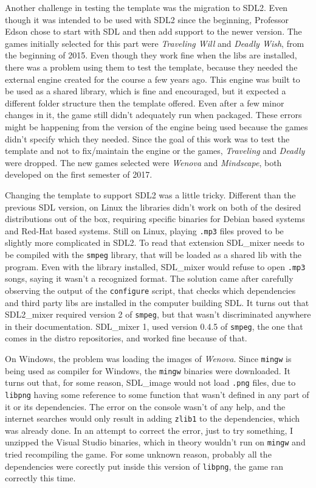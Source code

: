 Another challenge in testing the template was the migration to SDL2. Even though it was intended to be used with SDL2 since the beginning, Professor Edson chose to start with SDL and then add support to the newer version. The games initially selected for this part were \textit{Traveling Will} and \textit{Deadly Wish}, from the beginning of 2015. Even though they work fine when the libs are installed, there was a problem using them to test the template, because they needed the external engine created for the course a few years ago. This engine was built to be used as a shared library, which is fine and encouraged, but it expected a different folder structure then the template offered. Even after a few minor changes in it, the game still didn't adequately run when packaged. These errors might be happening from the version of the engine being used because the games didn't specify which they needed. Since the goal of this work was to test the template and not to fix/maintain the engine or the games, \textit{Traveling} and \textit{Deadly} were dropped. The new games selected were \textit{Wenova} and \textit{Mindscape}, both developed on the first semester of 2017.

Changing the template to support SDL2 was a little tricky. Different than the previous SDL version, on Linux the libraries didn't work on both of the desired distributions out of the box, requiring specific binaries for Debian based systems and Red-Hat based systems. Still on Linux, playing \texttt{.mp3} files proved to be slightly more complicated in SDL2. To read that extension SDL\_mixer needs to be compiled with the \texttt{smpeg} library, that will be loaded as a shared lib with the program. Even with the library installed, SDL\_mixer would refuse to open \texttt{.mp3} songs, saying it wasn't a recognized format. The solution came after carefully observing the output of the \texttt{configure} script, that checks which dependencies and third party libs are installed in the computer building SDL. It turns out that SDL2\_mixer required version 2 of \texttt{smpeg}, but that wasn't discriminated anywhere in their documentation. SDL\_mixer 1, used version 0.4.5 of \texttt{smpeg}, the one that comes in the distro repositories, and worked fine because of that.

On Windows, the problem was loading the images of \textit{Wenova}. Since \texttt{mingw} is being used as compiler for Windows, the \texttt{mingw} binaries were downloaded. It turns out that, for some reason, SDL\_image would not load \texttt{.png} files, due to \texttt{libpng} having some reference to some function that wasn't defined in any part of it or its dependencies. The error on the console wasn't of any help, and the internet searches would only result in adding \texttt{zlib1} to the dependencies, which was already done. In an attempt to correct the error, just to try something, I unzipped the Visual Studio binaries, which in theory wouldn't run on \texttt{mingw} and tried recompiling the game. For some unknown reason, probably all the dependencies were corectly put inside this version of \texttt{libpng}, the game ran correctly this time.

